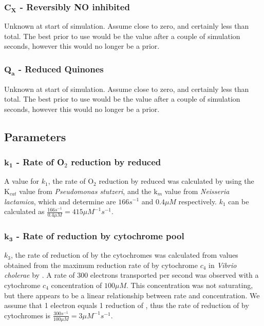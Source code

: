 \subsubsection*{$\mathbf{C_X}$ {\bf- Reversibly NO inhibited \cbbthree{}}}
Unknown at start of simulation. Assume close to zero, and certainly less than total. The best prior to use would be the value after a couple of simulation seconds, however this would no longer be a prior.

\subsubsection*{$\mathbf{Q_a}$ {\bf- Reduced Quinones}}
Unknown at start of simulation. Assume close to zero, and certainly less than total. The best prior to use would be the value after a couple of simulation seconds, however this would no longer be a prior.

\subsection*{Parameters}
\subsubsection*{$\mathbf{k_1}$ {\bf- Rate of O$_{\textrm{2}}$ reduction by reduced \cbbthree{}}}

A value for $k_1$, the rate of O$_{\textrm{2}}$ reduction by reduced \cbbthree{} was calculated by using the $\mathrm{K}_{cat}$ value from \textit{Pseudomonas stutzeri}, and the $\textrm{k}_m$ value from \textit{Neisseria lactamica}, which \citet{Forte2001} and \citet{Hunter2007} determine are $166s^{-1}$ and $0.4\mu M$ respectively. $k_1$ can be calculated as $\frac{166s^{-1}}{0.4\mu M} = 415\mu M^{-1} s^{-1}$.

\subsubsection*{$\mathbf{k_3}$ {\bf- Rate of \cbbthree{} reduction by cytochrome pool}}
$k_3$, the rate of reduction of \cbbthree{} by the cytochromes was calculated from values obtained from the maximum reduction rate of \cbbthree{} by cytochrome $c_4$ in \textit{Vibrio cholerae} by \citet{Chang2010}. A rate of 300 electrons transported per second was observed with a cytochrome $c_4$ concentration of $100\mu M$. This concentration was not saturating, but there appears to be a linear relationship between rate and concentration. We assume that 1 electron equals 1 reduction of \cbbthree{}, thus the rate of reduction of \cbbthree{} by cytochromes is $\frac{300s^{-1}}{100\mu M} = 3\mu M^{-1} s^{-1}$.

